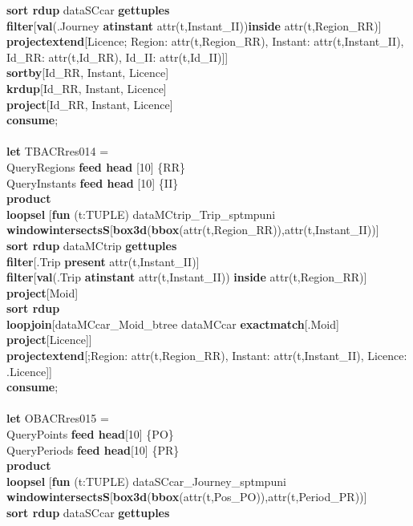 \documentclass[a4paper]{article}
\newcommand{\op}[1]{\textbf{#1}}
\begin{document}
\begin{scriptsize}
\begin{tabbing}
\>\>\op{sort rdup} dataSCcar  \op{gettuples}\\
\>\>\op{filter}[\op{val}(.Journey \op{atinstant} attr(t,Instant\_II))\op{inside} attr(t,Region\_RR)]\\
\>\>\op{projectextend}[Licence; Region: attr(t,Region\_RR), Instant: attr(t,Instant\_II), Id\_RR: attr(t,Id\_RR), Id\_II: attr(t,Id\_II)]]\\
\>\op{sortby}[Id\_RR, Instant, Licence]\\
\>\op{krdup}[Id\_RR, Instant, Licence]\\
\>\op{project}[Id\_RR, Instant, Licence]\\
\op{consume};\\
\\
\op{let} TBACRres014 =\\
\>QueryRegions  \op{feed head} [10] \{RR\}\\
\>QueryInstants \op{feed head} [10] \{II\}\\
\>\op{product}\\
\>\op{loopsel} [\op{fun} (t:TUPLE) dataMCtrip\_Trip\_sptmpuni \op{windowintersectsS}[\op{box3d}(\op{bbox}(attr(t,Region\_RR)),attr(t,Instant\_II))]\\
\>\>\op{sort rdup} dataMCtrip \op{gettuples}\\
\>\>\op{filter}[.Trip \op{present} attr(t,Instant\_II)]\\
\>\>\op{filter}[\op{val}(.Trip \op{atinstant} attr(t,Instant\_II)) \op{inside} attr(t,Region\_RR)]\\
\>\>\op{project}[Moid]\\
\>\>\op{sort rdup}\\
\>\>\op{loopjoin}[dataMCcar\_Moid\_btree dataMCcar \op{exactmatch}[.Moid] \op{project}[Licence]]\\
\>\>\op{projectextend}[;Region: attr(t,Region\_RR), Instant: attr(t,Instant\_II), Licence: .Licence]]\\
\op{consume};\\
\\
\op{let} OBACRres015 =\\
\>QueryPoints  \op{feed head}[10] \{PO\}\\
\>QueryPeriods \op{feed head}[10] \{PR\}\\
\>\op{product}\\
\>\op{loopsel} [\op{fun} (t:TUPLE) dataSCcar\_Journey\_sptmpuni \op{windowintersectsS}[\op{box3d}(\op{bbox}(attr(t,Pos\_PO)),attr(t,Period\_PR))]\\
\>\>\op{sort rdup} dataSCcar \op{gettuples}\\

\end{tabbing}
\end{scriptsize}
\end{document}

